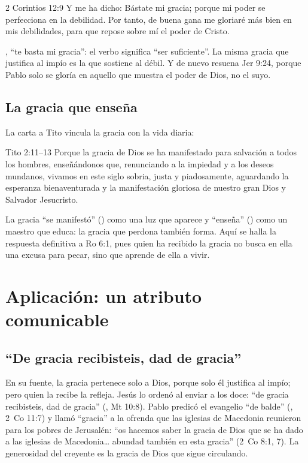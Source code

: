\begin{verso}{2 Corintios 12:9}
Y me ha dicho: Bástate mi gracia; porque mi poder se perfecciona en la debilidad. Por tanto, de buena gana me gloriaré más bien en mis debilidades, para que repose sobre mí el poder de Cristo.
\end{verso}

, ``te basta mi gracia'': el verbo  significa ``ser suficiente''. La misma gracia que justifica al impío es la que sostiene al débil. Y de nuevo resuena Jer 9:24, porque Pablo solo se gloría en aquello que muestra el poder de Dios, no el suyo.

\subsection{La gracia que enseña}
La carta a Tito vincula la gracia con la vida diaria:

\begin{verso}{Tito 2:11–13}
Porque la gracia de Dios se ha manifestado para salvación a todos los hombres, enseñándonos que, renunciando a la impiedad y a los deseos mundanos, vivamos en este siglo sobria, justa y piadosamente, aguardando la esperanza bienaventurada y la manifestación gloriosa de nuestro gran Dios y Salvador Jesucristo.
\end{verso}

La gracia ``se manifestó'' () como una luz que aparece y ``enseña'' () como un maestro que educa: la gracia que perdona también forma. Aquí se halla la respuesta definitiva a Ro 6:1, pues quien ha recibido la gracia no busca en ella una excusa para pecar, sino que aprende de ella a vivir.

\section{Aplicación: un atributo comunicable}

\subsection{“De gracia recibisteis, dad de gracia”}
En su fuente, la gracia pertenece solo a Dios, porque solo él justifica al impío; pero quien la recibe la refleja. Jesús lo ordenó al enviar a los doce: ``de gracia recibisteis, dad de gracia'' (, Mt 10:8). Pablo predicó el evangelio ``de balde'' (, 2~Co 11:7) y llamó ``gracia'' a la ofrenda que las iglesias de Macedonia reunieron para los pobres de Jerusalén: ``os hacemos saber la gracia de Dios que se ha dado a las iglesias de Macedonia\ldots{} abundad también en esta gracia'' (2~Co 8:1, 7). La generosidad del creyente es la gracia de Dios que sigue circulando.

